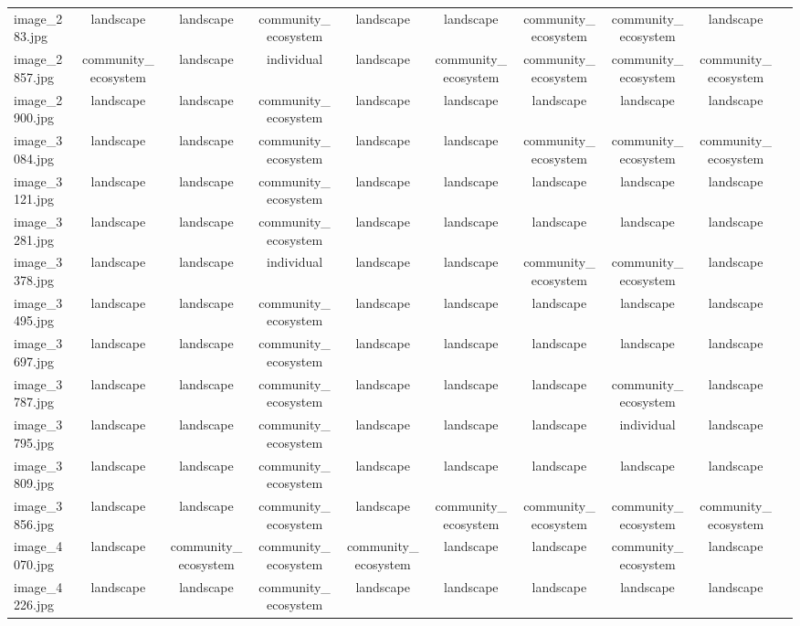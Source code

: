 \documentclass[hidelinks, 11pt]{article}
\begin{document}
\begin{longtable}{@{}lccccccccc@{}}
image\_283.jpg   & landscape & landscape & community\_ecosystem & landscape & landscape & community\_ecosystem & community\_ecosystem & landscape \\
image\_2857.jpg  & community\_ecosystem & landscape & individual & landscape & community\_ecosystem & community\_ecosystem & community\_ecosystem & community\_ecosystem \\
image\_2900.jpg  & landscape & landscape & community\_ecosystem & landscape & landscape & landscape & landscape & landscape \\
image\_3084.jpg  & landscape & landscape & community\_ecosystem & landscape & landscape & community\_ecosystem & community\_ecosystem & community\_ecosystem \\
image\_3121.jpg  & landscape & landscape & community\_ecosystem & landscape & landscape & landscape & landscape & landscape \\
image\_3281.jpg  & landscape & landscape & community\_ecosystem & landscape & landscape & landscape & landscape & landscape \\
image\_3378.jpg  & landscape & landscape & individual & landscape & landscape & community\_ecosystem & community\_ecosystem & landscape \\
image\_3495.jpg  & landscape & landscape & community\_ecosystem & landscape & landscape & landscape & landscape & landscape \\
image\_3697.jpg  & landscape & landscape & community\_ecosystem & landscape & landscape & landscape & landscape & landscape \\
image\_3787.jpg  & landscape & landscape & community\_ecosystem & landscape & landscape & landscape & community\_ecosystem & landscape \\
image\_3795.jpg  & landscape & landscape & community\_ecosystem & landscape & landscape & landscape & individual & landscape \\
image\_3809.jpg  & landscape & landscape & community\_ecosystem & landscape & landscape & landscape & landscape & landscape \\
image\_3856.jpg  & landscape & landscape & community\_ecosystem & landscape & community\_ecosystem & community\_ecosystem & community\_ecosystem & community\_ecosystem \\
image\_4070.jpg  & landscape & community\_ecosystem & community\_ecosystem & community\_ecosystem & landscape & landscape & community\_ecosystem & landscape \\
image\_4226.jpg  & landscape & landscape & community\_ecosystem & landscape & landscape & landscape & landscape & landscape \\

\end{longtable}
\end{document}
